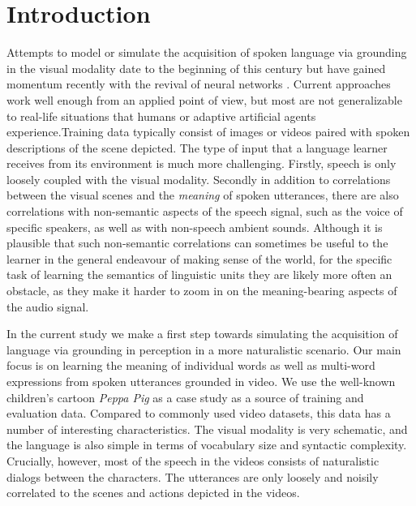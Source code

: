 \section{Introduction}
\label{sec:intro}

Attempts to model or simulate the acquisition of spoken language via
grounding in the visual modality date to the beginning of this century
\citep{roypentland2002learning} but have gained momentum recently
with the revival of neural networks
\citep[e.g.][]{synnaeve2014learning,harwath2015deep,
  harwath2016unsupervised,chrupala-etal-2017-representations,alishahi-etal-2017-encoding,harwath2018jointly,Merkx2019,havard2019models,rouditchenko2020avlnet,khorrami_2021,peng2021fastslow}.
Current approaches work well enough from an applied point of view, 
but most are not generalizable to real-life situations that humans or 
adaptive artificial agents experience.Training data
typically consist of images or videos paired with spoken descriptions
of the scene depicted. The type of input that a language learner receives 
from its environment is much more challenging.  Firstly, speech is only
loosely coupled with the visual modality. Secondly in addition to
correlations between the visual scenes and the {\it meaning} of spoken
utterances, there are also correlations with non-semantic aspects of
the speech signal, such as the voice of specific speakers, as well
as with non-speech ambient sounds. Although it is plausible that such
non-semantic correlations can sometimes be useful to the learner in
the general endeavour of making sense of the world, for the specific
task of learning the semantics of linguistic units they are likely more
often an obstacle, as they make it harder to zoom in on the
meaning-bearing aspects of the audio signal.

In the current study we make a first step towards simulating the
acquisition of language via grounding in perception in a more naturalistic
scenario.  Our main focus is on learning the meaning of individual words 
as well as multi-word expressions from spoken utterances grounded in video.  
We use the well-known children's cartoon {\it Peppa Pig} as
a case study as a source of training and evaluation data. Compared to
commonly used video datasets, this data has a number of interesting
characteristics.  The visual modality is very schematic, and the
language is also simple in terms of vocabulary size and syntactic
complexity. Crucially, however, most of the speech in the videos
consists of naturalistic dialogs between the characters. The
utterances are only loosely and noisily correlated to the scenes and
actions depicted in the videos.

